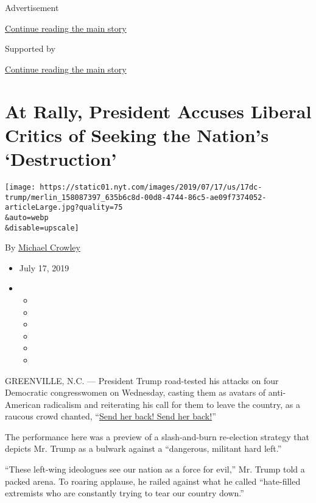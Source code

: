 Advertisement

\protect\hyperlink{after-top}{Continue reading the main story}

Supported by

\protect\hyperlink{after-sponsor}{Continue reading the main story}

\hypertarget{at-rally-president-accuses-liberal-critics-of-seeking-the-nations-destruction}{%
\section{At Rally, President Accuses Liberal Critics of Seeking the
Nation's
`Destruction'}\label{at-rally-president-accuses-liberal-critics-of-seeking-the-nations-destruction}}

\texttt{[image: https://static01.nyt.com/images/2019/07/17/us/17dc-trump/merlin\_158087397\_635b6c8d-00d8-4744-86c5-ae09f7374052-articleLarge.jpg?quality=75\\\&auto=webp\\\&disable=upscale]}

By \href{https://www.nytimes.com/by/michael-crowley}{Michael Crowley}

\begin{itemize}
\item
  July 17, 2019
\item
  \begin{itemize}
  \item
  \item
  \item
  \item
  \item
  \item
  \end{itemize}
\end{itemize}

GREENVILLE, N.C. --- President Trump road-tested his attacks on four
Democratic congresswomen on Wednesday, casting them as avatars of
anti-American radicalism and reiterating his call for them to leave the
country, as a raucous crowd chanted,
``\href{https://www.nytimes.com/2019/07/18/us/politics/ilhan-omar-donald-trump.html}{Send
her back! Send her back!}''

The performance here was a preview of a slash-and-burn re-election
strategy that depicts Mr. Trump as a bulwark against a ``dangerous,
militant hard left.''

``These left-wing ideologues see our nation as a force for evil,'' Mr.
Trump told a packed arena. To roaring applause, he railed against what
he called ``hate-filled extremists who are constantly trying to tear our
country down.''

